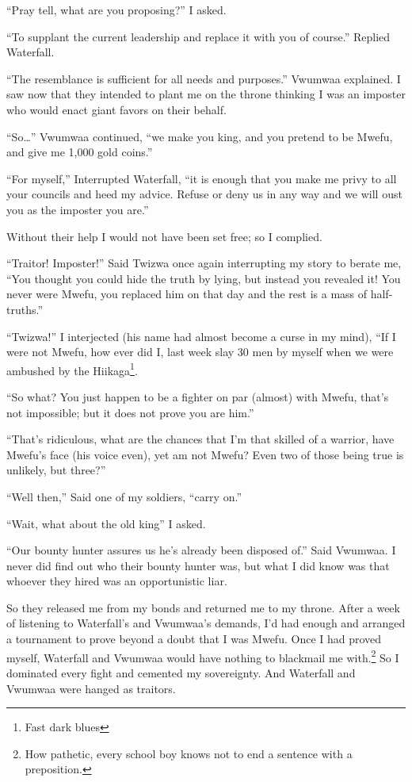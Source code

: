 ``Pray tell, what are you proposing?'' I asked.

``To supplant the current leadership and replace it with you of course.'' Replied Waterfall.

``The resemblance is sufficient for all needs and purposes.'' Vwumwaa explained. I saw now that they intended to plant me on the throne thinking I was an imposter who would enact giant favors on their behalf.

``So\ldots'' Vwumwaa continued, ``we make you king, and you pretend to be Mwefu, and give me 1,000 gold coins.''

``For myself,'' Interrupted Waterfall, ``it is enough that you make me privy to all your councils and heed my advice. Refuse or deny us in any way and we will oust you as the imposter you are.''

Without their help I would not have been set free; so I complied.

\tbreak

``Traitor! Imposter!'' Said Twizwa once again interrupting my story to berate me, ``You thought you could hide the truth by lying, but instead you revealed it! You never were Mwefu, you replaced him on that day and the rest is a mass of half-truths.''

``Twizwa!'' I interjected (his name had almost become a curse in my mind), ``If I were not Mwefu, how ever did I, last week slay 30 men by myself when we were ambushed by the Hiikaga\footnote{Fast dark blues}.

``So what? You just happen to be a fighter on par (almost) with Mwefu, that's not impossible; but it does not prove you are him.''

``That's ridiculous, what are the chances that I'm that skilled of a warrior, have Mwefu's face (his voice even), yet am not Mwefu? Even two of those being true is unlikely, but three?''

``Well then,'' Said one of my soldiers, ``carry on.''

\tbreak

``Wait, what about the old king'' I asked.

``Our bounty hunter assures us he's already been disposed of.'' Said Vwumwaa. I never did find out who their bounty hunter was, but what I did know was that whoever they hired was an opportunistic liar.

So they released me from my bonds and returned me to my throne. After a week of listening to Waterfall's and Vwumwaa's demands, I'd had enough and arranged a tournament to prove beyond a doubt that I was Mwefu. Once I had proved myself, Waterfall and Vwumwaa would have nothing to blackmail me with.\footnote{How pathetic, every school boy knows not to end a sentence with a preposition.} So I dominated every fight and cemented my sovereignty. And Waterfall and Vwumwaa were hanged as traitors.

